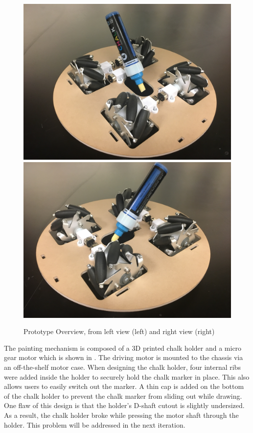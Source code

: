 \begin{figure}[h!]
\centering
\includegraphics[width=0.49\columnwidth]{CAD/full_system_1.jpeg}
\includegraphics[width=0.49\columnwidth]{CAD/full_system_2.jpeg}
\label{fig:em1}
\caption{Prototype Overview, from left view (left) and right view (right)}
\end{figure}
The painting mechanism is composed of a 3D printed chalk holder and a micro gear motor which is shown in . The driving motor is mounted to the chassis via an off-the-shelf motor case. When designing the chalk holder, four internal ribs were added inside the holder to securely hold the chalk marker in place. This also allows users to easily switch out the marker. A thin cap is added on the bottom of the chalk holder to prevent the chalk marker from sliding out while drawing. One flaw of this design is that the holder’s D-shaft cutout is slightly undersized. As a result, the chalk holder broke while pressing the motor shaft through the holder. This problem will be addressed in the next iteration. 

